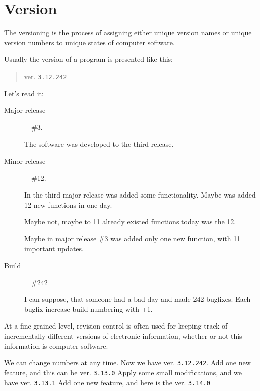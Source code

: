 \section{Version}
\label{sec:Version}

The versioning is the process of assigning either unique version names or unique version numbers to unique states of computer software. 

Usually the version of a program is presented like this: 

\begin{quote}
ver. \texttt{3.12.242}\end{quote} 

Let's read it:

\begin{description}
 \item[Major release]~\textemdash~\#3. 
 
 The software was developed to the third release.
 
 \item[Minor release]~\textemdash~\#12.
 
 In the third major release was added some functionality. Maybe was added 12 new functions in one day. 
 
 Maybe not, maybe to 11 already existed functions today was the 12. 
 
 Maybe in major release \#3 was added only one new function, with 11 important updates.

 \item[Build]~\textemdash~\#242 
 
 I can suppose, that someone had a bad day and made 242 bugfixes. Each bugfix increase build numbering with +1.
\end{description}

At a fine-grained level, revision control is often used for keeping track of incrementally different versions of electronic information, whether or not this information is computer software.

We can change numbers at any time. Now we have ver. \texttt{3.12.242}. Add one new feature, and this can be ver. \texttt{3.13.0} Apply some small modifications, and we have ver. \texttt{3.13.1} Add one new feature, and here is the ver. \texttt{3.14.0} 
